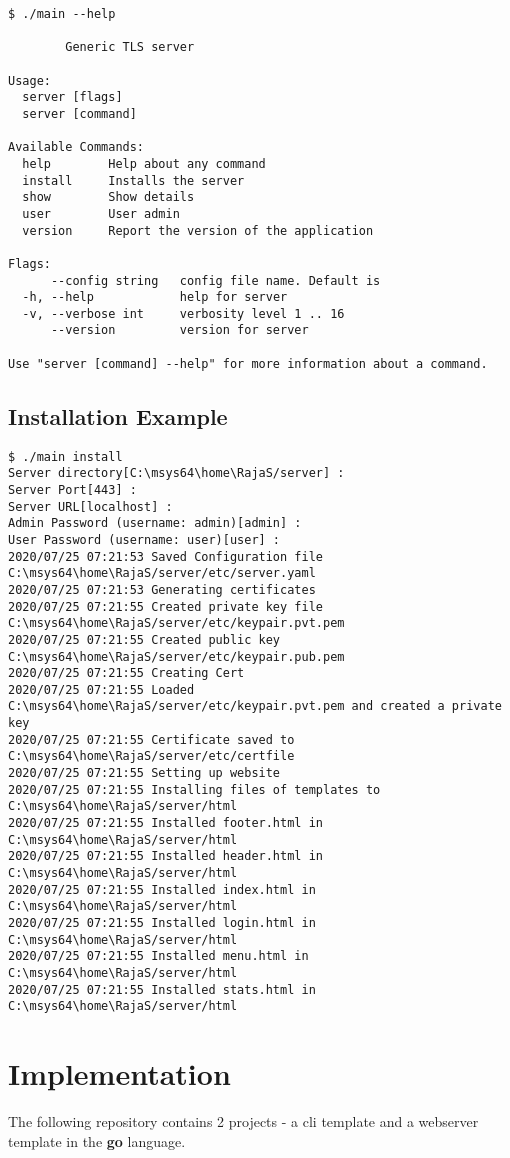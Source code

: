 \documentclass[12pt, a4paper]{article} %
\begin{document}
\begin{lstlisting}
$ ./main --help

        Generic TLS server

Usage:
  server [flags]
  server [command]

Available Commands:
  help        Help about any command
  install     Installs the server
  show        Show details
  user        User admin
  version     Report the version of the application

Flags:
      --config string   config file name. Default is
  -h, --help            help for server
  -v, --verbose int     verbosity level 1 .. 16
      --version         version for server

Use "server [command] --help" for more information about a command.

\end{lstlisting}
\begin{landscape}
\subsection{Installation Example}
\begin{lstlisting}
$ ./main install
Server directory[C:\msys64\home\RajaS/server] :
Server Port[443] :
Server URL[localhost] :
Admin Password (username: admin)[admin] :
User Password (username: user)[user] :
2020/07/25 07:21:53 Saved Configuration file C:\msys64\home\RajaS/server/etc/server.yaml
2020/07/25 07:21:53 Generating certificates
2020/07/25 07:21:55 Created private key file C:\msys64\home\RajaS/server/etc/keypair.pvt.pem
2020/07/25 07:21:55 Created public key C:\msys64\home\RajaS/server/etc/keypair.pub.pem
2020/07/25 07:21:55 Creating Cert
2020/07/25 07:21:55 Loaded C:\msys64\home\RajaS/server/etc/keypair.pvt.pem and created a private key
2020/07/25 07:21:55 Certificate saved to C:\msys64\home\RajaS/server/etc/certfile
2020/07/25 07:21:55 Setting up website
2020/07/25 07:21:55 Installing files of templates to C:\msys64\home\RajaS/server/html
2020/07/25 07:21:55 Installed footer.html in C:\msys64\home\RajaS/server/html
2020/07/25 07:21:55 Installed header.html in C:\msys64\home\RajaS/server/html
2020/07/25 07:21:55 Installed index.html in C:\msys64\home\RajaS/server/html
2020/07/25 07:21:55 Installed login.html in C:\msys64\home\RajaS/server/html
2020/07/25 07:21:55 Installed menu.html in C:\msys64\home\RajaS/server/html
2020/07/25 07:21:55 Installed stats.html in C:\msys64\home\RajaS/server/html

\end{lstlisting}

\end{landscape}

\section{Implementation}
 The following repository contains 2 projects - a cli template and a webserver template in the \textbf{go} language.
 
\paragraph{}
\end{document}
